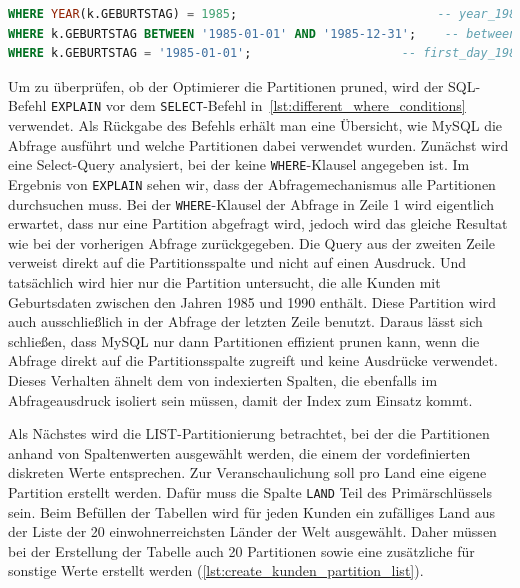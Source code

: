 \vspace{-5pt}
\begin{lstlisting}[language=SQL,caption=Unterschiedliche WHERE-Bedingungen,label={lst:different_where_conditions}]
WHERE YEAR(k.GEBURTSTAG) = 1985;		                    -- year_1985.sql
WHERE k.GEBURTSTAG BETWEEN '1985-01-01' AND '1985-12-31'; 	 -- between_1985.sql
WHERE k.GEBURTSTAG = '1985-01-01';		               -- first_day_1985.sql
\end{lstlisting}
\vspace{-5pt}

Um zu überprüfen, ob der Optimierer die Partitionen pruned, wird der SQL-Befehl \texttt{EXPLAIN} vor dem \texttt{SELECT}-Befehl in~\ref{lst:different_where_conditions} verwendet.
Als Rückgabe des Befehls erhält man eine Übersicht, wie MySQL die Abfrage ausführt und welche Partitionen dabei verwendet wurden.
Zunächst wird eine Select-Query analysiert, bei der keine \texttt{WHERE}-Klausel angegeben ist.
Im Ergebnis von \texttt{EXPLAIN} sehen wir, dass der Abfragemechanismus alle Partitionen durchsuchen muss.
Bei der \texttt{WHERE}-Klausel der Abfrage in Zeile 1 wird eigentlich erwartet, dass nur eine Partition abgefragt wird, jedoch wird das gleiche Resultat wie bei der vorherigen Abfrage zurückgegeben.
Die Query aus der zweiten Zeile verweist direkt auf die Partitionsspalte und nicht auf einen Ausdruck.
Und tatsächlich wird hier nur die Partition untersucht, die alle Kunden mit Geburtsdaten zwischen den Jahren 1985 und 1990 enthält.
Diese Partition wird auch ausschließlich in der Abfrage der letzten Zeile benutzt.
Daraus lässt sich schließen, dass MySQL nur dann Partitionen effizient prunen kann, wenn die Abfrage direkt auf die Partitionsspalte zugreift und keine Ausdrücke verwendet.
Dieses Verhalten ähnelt dem von indexierten Spalten, die ebenfalls im Abfrageausdruck isoliert sein müssen, damit der Index zum Einsatz kommt.

Als Nächstes wird die LIST-Partitionierung betrachtet, bei der die Partitionen anhand von Spaltenwerten ausgewählt werden, die einem der vordefinierten diskreten Werte entsprechen.
Zur Veranschaulichung soll pro Land eine eigene Partition erstellt werden.
Dafür muss die Spalte \texttt{LAND} Teil des Primärschlüssels sein.
Beim Befüllen der Tabellen wird für jeden Kunden ein zufälliges Land aus der Liste der 20 einwohnerreichsten Länder der Welt ausgewählt.
Daher müssen bei der Erstellung der Tabelle auch 20 Partitionen sowie eine zusätzliche für sonstige Werte erstellt werden (\ref{lst:create_kunden_partition_list}).

